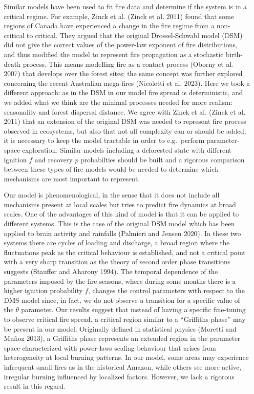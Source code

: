 \documentclass[
]{article}
\begin{document}
Similar models have been used to fit fire data and determine if the
system is in a critical regime. For example, Zinck et al. (Zinck et al.
2011) found that some regions of Canada have experienced a change in the
fire regime from a non-critical to critical. They argued that the
original Drossel-Schwabl model (DSM) did not give the correct values of
the power-law exponent of fire distributions, and thus modified the
model to represent fire propagation as a stochastic birth-death process.
This means modelling fire as a contact process (Oborny et al. 2007) that
develops over the forest sites; the same concept was further explored
concerning the recent Australian mega-fires (Nicoletti et al. 2023).
Here we took a different approach: as in the DSM in our model fire
spread is deterministic, and we added what we think are the minimal
processes needed for more realism: seasonality and forest dispersal
distance. We agree with Zinck et al. (Zinck et al. 2011) that an
extension of the original DSM was needed to represent fire process
observed in ecosystems, but also that not all complexity can or should
be added; it is necessary to keep the model tractable in order to
e.g.~perform parameter-space exploration. Similar models including a
deforested state with different ignition \(f\) and recovery \(p\)
probabilties should be built and a rigorous comparison between these
types of fire models would be needed to determine which mechanisms are
most important to represent.

Our model is phenomenological, in the sense that it does not include all
mechanisms present at local scales but tries to predict fire dynamics at
broad scales. One of the advantages of this kind of model is that it can
be applied to different systems. This is the case of the original DSM
model which has been applied to brain activity and rainfalls (Palmieri
and Jensen 2020). In these two systems there are cycles of loading and
discharge, a broad region where the fluctuations peak as the critical
behaviour is established, and not a critical point with a very sharp
transition as the theory of second order phase transitions suggests
(Stauffer and Aharony 1994). The temporal dependence of the parameters
imposed by the fire seasons, where during some months there is a higher
ignition probability \(f\), changes the control parameters with respect
to the DMS model since, in fact, we do not observe a transition for a
specific value of the \(\theta\) parameter. Our results suggest that
instead of having a specific fine-tuning to observe critical fire
spread, a critical region similar to a ``Griffiths phase'' may be
present in our model. Originally defined in statistical physics (Moretti
and Muñoz 2013), a Griffiths phase represents an extended region in the
parameter space characterized with power-laws scaling behaviour that
arises from heterogeneity at local burning patterns. In our model, some
areas may experience infrequent small fires as in the historical Amazon,
while others see more active, irregular burning influenced by localized
factors. However, we lack a rigorous result in this regard.
\end{document}
